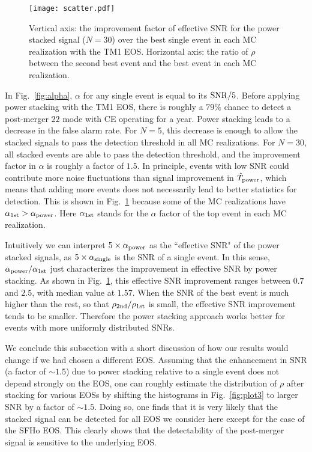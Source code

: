 \documentclass[prd,aps,floatfix,superscriptaddress,nofootinbib,twocolumn,10pt,English]{revtex4-1}
\begin{document}
 
 \begin{figure}[tb]
\texttt{[image: scatter.pdf]}
\caption{Vertical axis: the improvement factor of
  effective SNR for the power stacked signal ($N=30$) over the best single
  event in each MC realization with the TM1 EOS. Horizontal axis: the
  ratio of $\rho$ between the second best event and the best event in
  each MC realization.  }
\label{fig:plotscatter}
\end{figure}
 
In Fig.~\ref{fig:alpha}, $\alpha$ for any single event is equal to its
${\rm SNR}/5$. Before applying power stacking with the TM1
EOS, there is roughly a $79\%$ chance to detect a post-merger $22$
mode with CE operating for a year.  Power stacking leads to a
decrease in the false alarm rate. For $N=5$, this decrease is enough
to allow the stacked signals to pass the detection threshold in all MC realizations. For $N=30$, all stacked events
are able to pass the detection threshold, and the improvement factor in $\alpha$ is roughly a factor of $1.5$. In principle, events with
low SNR could contribute more noise fluctuations than signal
improvement in $\hat{T}_{\rm power}$, which means that adding more
events does not necessarily lead to better statistics for detection.
This is shown in Fig.~\ref{fig:plotscatter} because some of the MC
realizations have $\alpha_{\rm 1st} > \alpha_{\rm
  power}$. Here $\alpha_{\rm 1st}$ stands for the $\alpha$ factor
  of the top event in each MC realization.

Intuitively we can interpret $5 \times \alpha_{\rm power}$ as the
``effective SNR" of the power stacked signals, as $5 \times
\alpha_{\rm single}$ is the SNR of a single event. In this sense,
$\alpha_{\rm power}/\alpha_{\rm 1st}$ just characterizes the
improvement in effective SNR by power stacking. As shown in
Fig.~\ref{fig:plotscatter}, this effective SNR improvement ranges
between $0.7$ and $2.5$, with median value at $1.57$. When the SNR of
the best event is much higher than the rest, so that $\rho_{\rm
  2nd}/\rho_{\rm 1st}$ is small, the effective SNR improvement tends
to be smaller. Therefore the power stacking approach works better for
events with more uniformly distributed SNRs.

We conclude this subsection with a short discussion of how our results
would change if we had chosen a different EOS.  Assuming that the
enhancement in SNR (a factor of $\sim 1.5$) due to power stacking
relative to a single event does not depend strongly on the EOS, one can
roughly estimate the distribution of $\rho$ after stacking for various
EOSs by shifting the histograms in Fig.~\ref{fig:plot3} to larger SNR
by a factor of $\sim 1.5$.  Doing so, one finds that it is very likely
that the stacked signal can be detected for all EOS we consider here
except for the case of the SFHo EOS. This clearly shows that the
detectability of the post-merger signal is sensitive to the underlying
EOS.
\end{document}

